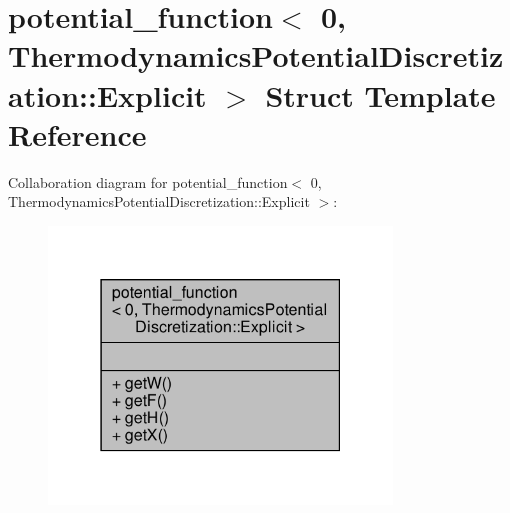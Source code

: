 \hypertarget{structpotential__function_3_010_00_01ThermodynamicsPotentialDiscretization_1_1Explicit_01_4}{}\section{potential\+\_\+function$<$ 0, Thermodynamics\+Potential\+Discretization\+:\+:Explicit $>$ Struct Template Reference}
\label{structpotential__function_3_010_00_01ThermodynamicsPotentialDiscretization_1_1Explicit_01_4}


Collaboration diagram for potential\+\_\+function$<$ 0, Thermodynamics\+Potential\+Discretization\+:\+:Explicit $>$\+:\nopagebreak
\begin{figure}[H]
\begin{center}
\leavevmode
\includegraphics[width=259pt]{structpotential__function_3_010_00_01ThermodynamicsPotentialDiscretization_1_1Explicit_01_4__coll__graph}
\end{center}
\end{figure}
